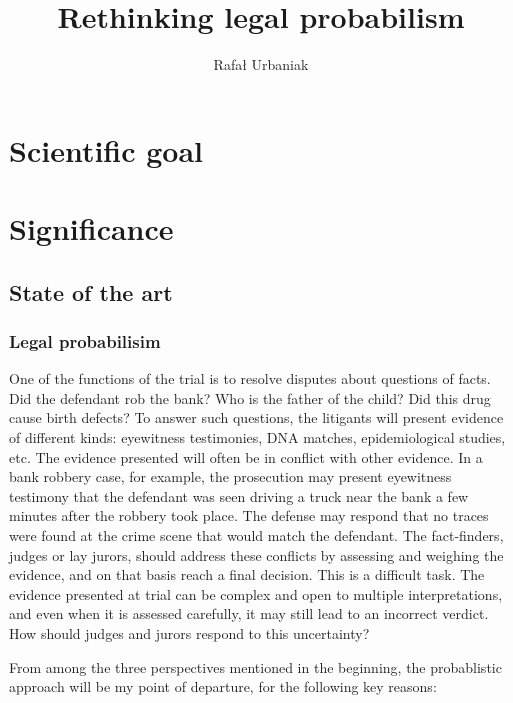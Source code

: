 \documentclass[11pt,dvipsnames,enabledeprecatedfontcommands]{scrartcl}
\title{Rethinking legal probabilism}
\author{Rafał Urbaniak}
\date{}
\begin{document}
\maketitle

\thispagestyle{empty}

\hypertarget{scientific-goal}{%
\section{Scientific goal}\label{scientific-goal}}

\hypertarget{significance}{%
\section{Significance}\label{significance}}

\hypertarget{state-of-the-art}{%
\subsection{State of the art}\label{state-of-the-art}}

\hypertarget{legal-probabilisim}{%
\subsubsection{Legal probabilisim}\label{legal-probabilisim}}

One of the functions of the trial is to resolve disputes about questions
of facts. Did the defendant rob the bank? Who is the father of the
child? Did this drug cause birth defects? To answer such questions, the
litigants will present evidence of different kinds: eyewitness
testimonies, DNA matches, epidemiological studies, etc. The evidence
presented will often be in conflict with other evidence. In a bank
robbery case, for example, the prosecution may present eyewitness
testimony that the defendant was seen driving a truck near the bank a
few minutes after the robbery took place. The defense may respond that
no traces were found at the crime scene that would match the defendant.
The fact-finders, judges or lay jurors, should address these conflicts
by assessing and weighing the evidence, and on that basis reach a final
decision. This is a difficult task. The evidence presented at trial can
be complex and open to multiple interpretations, and even when it is
assessed carefully, it may still lead to an incorrect verdict. How
should judges and jurors respond to this uncertainty?

From among the three perspectives mentioned in the beginning, the
probablistic approach will be my point of departure, for the following
key reasons:
\end{document}
